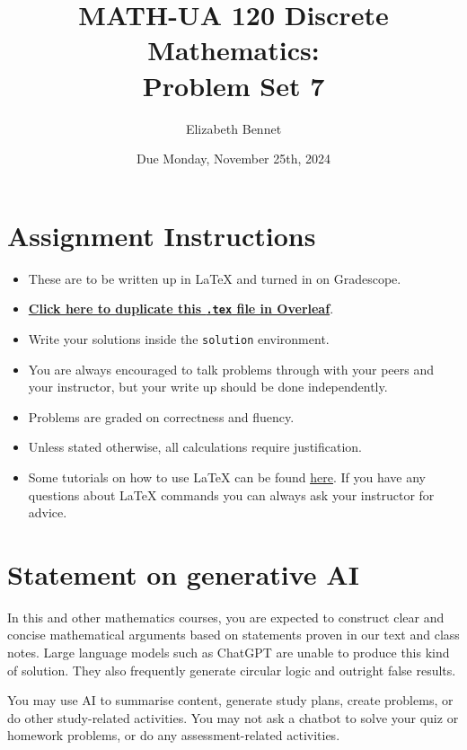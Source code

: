 \documentclass{article}
\title{\textbf{MATH-UA 120 Discrete Mathematics: \\ Problem Set 7}}
\author{%
    Elizabeth Bennet %
}
\date{Due Monday, November 25th, 2024} %
\theoremstyle{definition}
\begin{document}
\maketitle %

\vfill

\section*{Assignment Instructions}

\begin{itemize}
    \item These are to be written up in \LaTeX{} and turned in on Gradescope.
    \item \href{https://bit.ly/3yXgVOl}{\textbf{Click here to duplicate this \texttt{.tex} file in Overleaf}}.
    \item Write your solutions inside the \texttt{solution} environment.
    \item You are always encouraged to talk problems through with your peers and your instructor, but your write up should be done independently.
    \item Problems are graded on correctness and fluency.
    \item Unless stated otherwise, all calculations require justification.
    \item Some tutorials on how to use \LaTeX{} can be found \href{https://www.overleaf.com/learn/latex/Tutorials}{\underline{here}}. If you have any questions about \LaTeX{} commands you can always ask your instructor for advice.
\end{itemize}

\vfill

\section*{Statement on generative AI}

In this and other mathematics courses, you are expected to construct clear and concise mathematical arguments based on statements proven in our text and class notes. Large language models such as ChatGPT are unable to produce this kind of solution. They also frequently generate circular logic and outright false results.
 
You may use AI to summarise content, generate study plans, create problems, or do other study-related activities. You may not ask a chatbot to solve your quiz or homework problems, or do any assessment-related activities.
 
\end{document}
